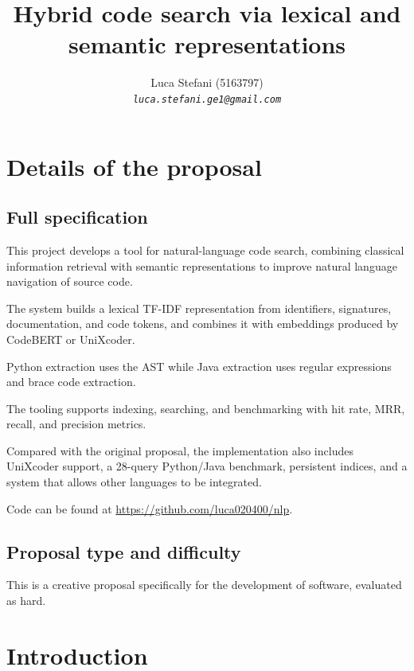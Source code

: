 \documentclass[12pt]{article}
\begin{document}
\title{Hybrid code search via lexical and semantic representations}
\author{Luca Stefani (5163797)\\
{\em \texttt{luca.stefani.ge1@gmail.com}}}
\date{}
\maketitle

\section{Details of the proposal}
\label{sec:yourProposal}

\subsection{Full specification}

This project develops a tool for natural-language code search, combining classical information
retrieval with semantic representations to improve natural language navigation of source code.

The system builds a lexical TF-IDF representation from identifiers, signatures, documentation,
and code tokens, and combines it with embeddings produced by CodeBERT or UniXcoder.

Python extraction uses the AST while Java extraction uses regular expressions and brace code extraction.

The tooling supports indexing, searching, and benchmarking with hit rate, MRR, recall, and precision metrics.

Compared with the original proposal, the implementation also includes UniXcoder support, a 28-query Python/Java benchmark,
persistent indices, and a system that allows other languages to be integrated.

Code can be found at \url{https://github.com/luca020400/nlp}.

\subsection{Proposal type and difficulty}

This is a creative proposal specifically for the development of software, evaluated as hard.

\pagebreak

\section{Introduction}
\label{sec:intro}
\end{document}
